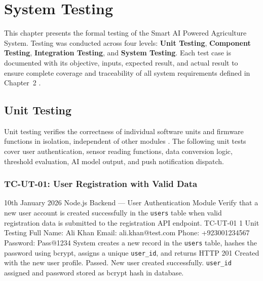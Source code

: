 \section{System Testing}

This chapter presents the formal testing of the Smart AI 
Powered Agriculture System. Testing was conducted across four 
levels: \textbf{Unit Testing}, \textbf{Component Testing}, 
\textbf{Integration Testing}, and \textbf{System Testing}. 
Each test case is documented with its objective, inputs, 
expected result, and actual result to ensure complete coverage 
and traceability of all system requirements defined in 
Chapter~2 \cite{sommerville2016software, tahir2019traceability}.

\subsection{Unit Testing}

Unit testing verifies the correctness of individual software 
units and firmware functions in isolation, independent of 
other modules \cite{sommerville2016software}. The following 
unit tests cover user authentication, sensor reading 
functions, data conversion logic, threshold evaluation, 
AI model output, and push notification dispatch.

\subsubsection{TC-UT-01: User Registration with Valid Data}

\testcase%
{10th January 2026}%
{Node.js Backend --- User Authentication Module}%
{Verify that a new user account is created successfully in
the \texttt{users} table when valid registration data is
submitted to the registration API endpoint.}%
{TC-UT-01}%
{1}%
{Unit Testing}%
{Full Name: Ali Khan \newline
Email: ali.khan@test.com \newline
Phone: +923001234567 \newline
Password: Pass@1234}%
{System creates a new record in the \texttt{users} table,
hashes the password using bcrypt, assigns a unique
\texttt{user\_id}, and returns HTTP 201 Created with the
new user profile.}%
{Passed. New user created successfully. \texttt{user\_id}
assigned and password stored as bcrypt hash in database.}

